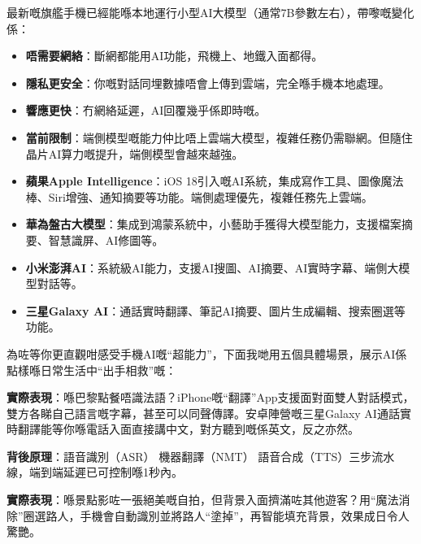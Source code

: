 
最新嘅旗艦手機已經能喺本地運行小型AI大模型（通常7B參數左右），帶嚟嘅變化係：

\begin{itemize}
  \item \textbf{唔需要網絡}：斷網都能用AI功能，飛機上、地鐵入面都得。
  \item \textbf{隱私更安全}：你嘅對話同埋數據唔會上傳到雲端，完全喺手機本地處理。
  \item \textbf{響應更快}：冇網絡延遲，AI回覆幾乎係即時嘅。
  \item \textbf{當前限制}：端側模型嘅能力仲比唔上雲端大模型，複雜任務仍需聯網。但隨住晶片AI算力嘅提升，端側模型會越來越強。
\end{itemize}


\begin{itemize}
  \item \textbf{蘋果Apple Intelligence}：iOS 18引入嘅AI系統，集成寫作工具、圖像魔法棒、Siri增強、通知摘要等功能。端側處理優先，複雜任務先上雲端。
  \item \textbf{華為盤古大模型}：集成到鴻蒙系統中，小藝助手獲得大模型能力，支援檔案摘要、智慧識屏、AI修圖等。
  \item \textbf{小米澎湃AI}：系統級AI能力，支援AI搜圖、AI摘要、AI實時字幕、端側大模型對話等。
  \item \textbf{三星Galaxy AI}：通話實時翻譯、筆記AI摘要、圖片生成編輯、搜索圈選等功能。
\end{itemize}


為咗等你更直觀咁感受手機AI嘅“超能力”，下面我哋用五個具體場景，展示AI係點樣喺日常生活中“出手相救”嘅：


\textbf{實際表現}：喺巴黎點餐唔識法語？iPhone嘅“翻譯”App支援面對面雙人對話模式，雙方各睇自己語言嘅字幕，甚至可以同聲傳譯。安卓陣營嘅三星Galaxy AI通話實時翻譯能等你喺電話入面直接講中文，對方聽到嘅係英文，反之亦然。

\textbf{背後原理}：語音識別（ASR） 機器翻譯（NMT） 語音合成（TTS）三步流水線，端到端延遲已可控制喺1秒內。


\textbf{實際表現}：喺景點影咗一張絕美嘅自拍，但背景入面擠滿咗其他遊客？用“魔法消除”圈選路人，手機會自動識別並將路人“塗掉”，再智能填充背景，效果成日令人驚艷。

